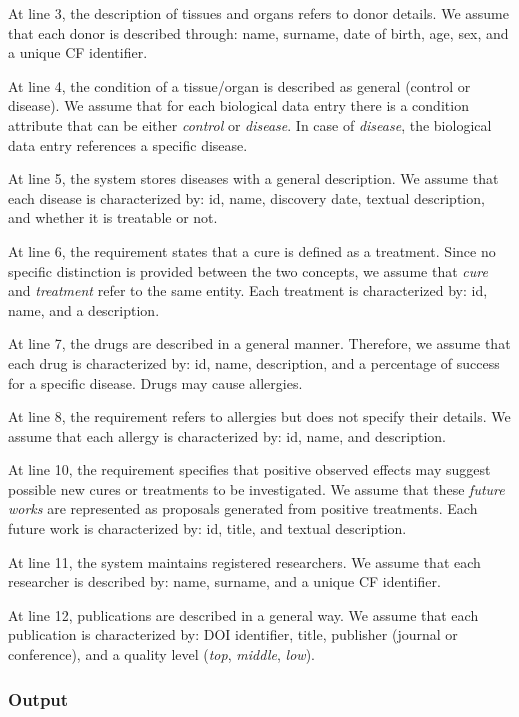 \documentclass[11pt,a4paper]{article}
\begin{document}
At line 3, the description of tissues and organs refers to donor details. We assume that each donor is described through: name, surname, date of birth, age, sex, and a unique CF identifier.

At line 4, the condition of a tissue/organ is described as general (control or disease). We assume that for each biological data entry there is a condition attribute that can be either \textit{control} or \textit{disease}. In case of \textit{disease}, the biological data entry references a specific disease.

At line 5, the system stores diseases with a general description. We assume that each disease is characterized by: id, name, discovery date, textual description, and whether it is treatable or not.

At line 6, the requirement states that a cure is defined as a treatment. Since no specific distinction is provided between the two concepts, we assume that \textit{cure} and \textit{treatment} refer to the same entity. Each treatment is characterized by: id, name, and a description.

At line 7, the drugs are described in a general manner. Therefore, we assume that each drug is characterized by: id, name, description, and a percentage of success for a specific disease. Drugs may cause allergies.

At line 8, the requirement refers to allergies but does not specify their details. We assume that each allergy is characterized by: id, name, and description.

At line 10, the requirement specifies that positive observed effects may suggest possible new cures or treatments to be investigated. We assume that these \textit{future works} are represented as proposals generated from positive treatments. Each future work is characterized by: id, title, and textual description.

At line 11, the system maintains registered researchers. We assume that each researcher is described by: name, surname, and a unique CF identifier.

At line 12, publications are described in a general way. We assume that each publication is characterized by: DOI identifier, title, publisher (journal or conference), and a quality level (\textit{top}, \textit{middle}, \textit{low}).

\subsubsection{Output}
\end{document}
